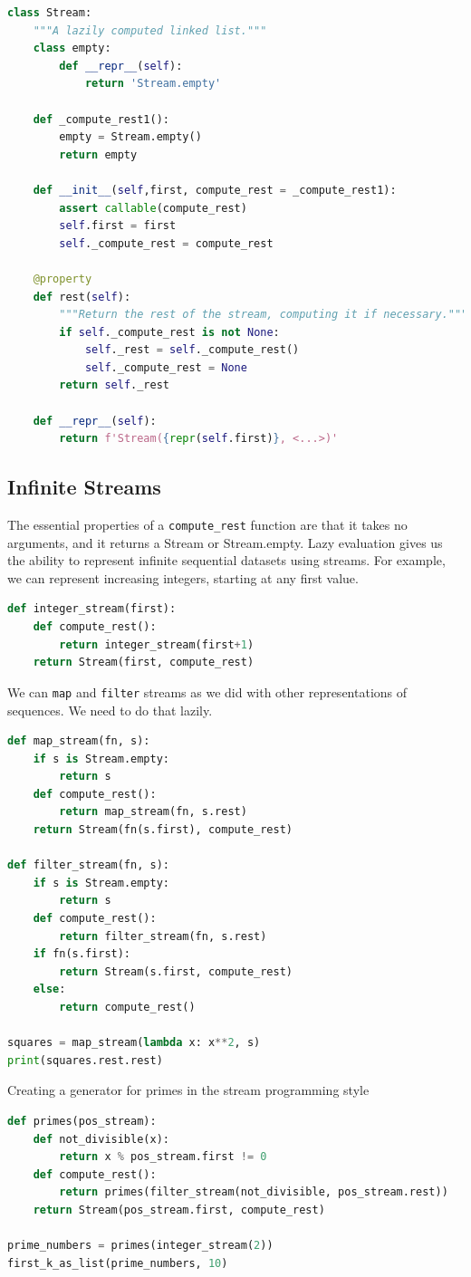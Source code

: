 \documentclass[a4paper,twoside]{article}
\numberwithin{equation}{section}
\begin{document}
\begin{lstlisting}[language=Python]
class Stream:
    """A lazily computed linked list."""
    class empty:
        def __repr__(self):
            return 'Stream.empty'

    def _compute_rest1():
        empty = Stream.empty()
        return empty

    def __init__(self,first, compute_rest = _compute_rest1):
        assert callable(compute_rest)
        self.first = first
        self._compute_rest = compute_rest

    @property
    def rest(self):
        """Return the rest of the stream, computing it if necessary."""
        if self._compute_rest is not None:
            self._rest = self._compute_rest()
            self._compute_rest = None
        return self._rest

    def __repr__(self):
        return f'Stream({repr(self.first)}, <...>)'
\end{lstlisting}


\subsection{Infinite Streams}
The essential properties of a \texttt{compute\_rest} function are that it takes no arguments, and
it returns a Stream or Stream.empty.
Lazy evaluation gives us the ability to represent infinite sequential datasets using streams. For example, we can represent increasing integers, starting at any first value.

\begin{lstlisting}[language=Python]
def integer_stream(first):
    def compute_rest():
        return integer_stream(first+1)
    return Stream(first, compute_rest)
\end{lstlisting}
We can \texttt{map} and \texttt{filter} streams as we did with other representations of sequences.
We need to do that lazily.

\begin{lstlisting}[language=Python]
def map_stream(fn, s):
    if s is Stream.empty:
        return s
    def compute_rest():
        return map_stream(fn, s.rest)
    return Stream(fn(s.first), compute_rest)

def filter_stream(fn, s):
    if s is Stream.empty:
        return s
    def compute_rest():
        return filter_stream(fn, s.rest)
    if fn(s.first):
        return Stream(s.first, compute_rest)
    else:
        return compute_rest()

squares = map_stream(lambda x: x**2, s)
print(squares.rest.rest)

\end{lstlisting}
Creating a generator for primes in the stream programming style
\begin{lstlisting}[language=Python]
def primes(pos_stream):
    def not_divisible(x):
        return x % pos_stream.first != 0
    def compute_rest():
        return primes(filter_stream(not_divisible, pos_stream.rest))
    return Stream(pos_stream.first, compute_rest)

prime_numbers = primes(integer_stream(2))
first_k_as_list(prime_numbers, 10)
\end{lstlisting}
\end{document}
